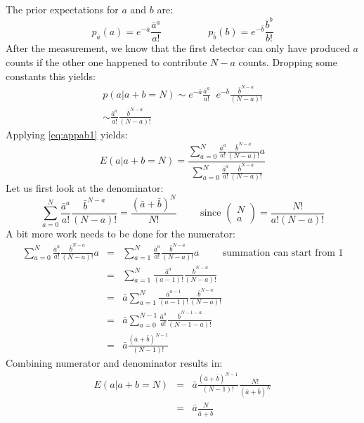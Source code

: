 The prior expectations for $a$ and $b$ are:
\begin{equation}
  p_{\bar{a}}(a) = e^{-\bar{a}} \frac{\bar{a}^a}{a!} \hspace{2cm}
  p_{\bar{b}}(b) = e^{-\bar{b}} \frac{\bar{b}^b}{b!}
\end{equation}
After the measurement, we know that the first detector can only have produced
$a$ counts if the other one happened to contribute $N-a$ counts. Dropping some
constants this yields:
\begin{align}
  p(a | a + b = N) \sim e^{-\bar{a}} \frac{\bar{a}^a}{a!} \;\;
                        e^{-\bar{b}} \frac{\bar{b}^{N-a}}{(N-a)!}\\
    \sim \frac{\bar{a}^a}{a!} \frac{\bar{b}^{N-a}}{(N-a)!}
\end{align}
Applying \ref{eq:appab1} yields:
\begin{equation}
  E(a | a+b=N)
  = \frac{\sum_{a=0}^N \frac{\bar{a}^a}{a!} \frac{\bar{b}^{N-a}}{(N-a)!} a}
         {\sum_{a=0}^N \frac{\bar{a}^a}{a!} \frac{\bar{b}^{N-a}}{(N-a)!}}
\end{equation}
Let us first look at the denominator:
\begin{equation}
  \sum_{a=0}^N \frac{\bar{a}^a}{a!} \frac{\bar{b}^{N-a}}{(N-a)!}
  = \frac{(\bar{a} + \bar{b})^N}{N!}
\hspace{1cm} \mbox{since } \left( \begin{array}{cc} N\\a \end{array}\right)
   = \frac{N!}{a! (N-a)!}
\end{equation}
A bit more work needs to be done for the numerator:
\begin{align}
 \sum_{a=0}^N \frac{\bar{a}^a}{a!} \frac{\bar{b}^{N-a}}{(N-a)!} a
  & = & \sum_{a=1}^N \frac{\bar{a}^a}{a!} \frac{\bar{b}^{N-a}}{(N-a)!} a
    \hspace{1cm} \mbox{summation can start from 1}\\
  & = & \sum_{a=1}^N \frac{\bar{a}^a}{(a-1)!} \frac{\bar{b}^{N-a}}{(N-a)!}\\
  & = & \bar{a} \sum_{a=1}^N \frac{\bar{a}^{a-1}}{(a-1)!}
                             \frac{\bar{b}^{N-a}}{(N-a)!}\\
  & = & \bar{a} \sum_{a=0}^{N-1} \frac{\bar{a}^a}{a!} 
                                 \frac{\bar{b}^{N-1-a}}{(N-1-a)!}\\
  & = & \bar{a} \frac{(\bar{a} + \bar{b})^{N-1}}{(N-1)!}
\end{align}
Combining numerator and denominator results in:
\begin{align}
  E(a | a+b=N) & = & \bar{a} \frac{(\bar{a} + \bar{b})^{N-1}}{(N-1)!}
                     \frac{N!}{(\bar{a} + \bar{b})^N}\\
  & = & \bar{a} \frac{N}{\bar{a} + \bar{b}}
\end{align}

